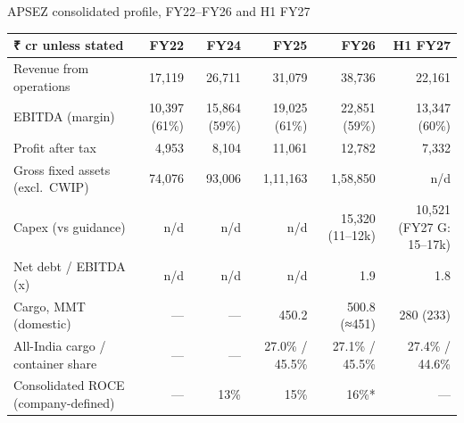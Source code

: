 \documentclass[12pt, a4paper]{article}
\newcommand{\exsource}[1]{\par\vspace{4pt}{\footnotesize\raggedright #1\par}}
\newcommand{\tablesetup}{\footnotesize\renewcommand{\arraystretch}{1.25}\setlength{\tabcolsep}{4pt}}
\newcommand{\rowsep}{\addlinespace[3pt]}
\begin{document}
\begin{exhibit}[!htbp]
\caption{APSEZ consolidated profile, FY22--FY26 and H1 FY27}\label{ex:profile}
{\tablesetup
\begin{tabularx}{\linewidth}{P{41mm}RRRRR}
\toprule
\textbf{₹ cr unless stated} & \textbf{FY22} & \textbf{FY24} & \textbf{FY25} & \textbf{FY26} & \textbf{H1 FY27} \\
\midrule
Revenue from operations & 17,119 & 26,711 & 31,079 & 38,736 & 22,161 \\ \rowsep
EBITDA (margin) & 10,397 (61\%) & 15,864 (59\%) & 19,025 (61\%) & 22,851 (59\%) & 13,347 (60\%) \\ \rowsep
Profit after tax & 4,953 & 8,104 & 11,061 & 12,782 & 7,332 \\ \rowsep
Gross fixed assets (excl.\ CWIP) & 74,076 & 93,006 & 1,11,163 & 1,58,850 & n/d \\ \rowsep
Capex (vs guidance) & n/d & n/d & n/d & 15,320 (11--12k) & 10,521 (FY27 G: 15--17k) \\ \rowsep
Net debt / EBITDA (x) & n/d & n/d & n/d & 1.9 & 1.8 \\ \rowsep
Cargo, MMT (domestic) & --- & --- & 450.2 & 500.8 (≈451) & 280 (233) \\ \rowsep
All-India cargo / container share & --- & --- & 27.0\% / 45.5\% & 27.1\% / 45.5\% & 27.4\% / 44.6\% \\ \rowsep
Consolidated ROCE (company-defined) & --- & 13\% & 15\% & 16\%* & --- \\
\bottomrule
\end{tabularx}}
\exsource{Sources: APSEZ (2026a; 2026d). FY figures are the management
presentation basis. The audited FY25 revenue is ₹30,475 cr (APSEZ, 2026b),
against the restated ₹31,079 cr shown here. *Excludes NQXT. n/d = not disclosed
in the documents reviewed. H1 FY27 market shares are compared with H1 FY26
(28.0\% / 45.5\%).}
\end{exhibit}
\end{document}
